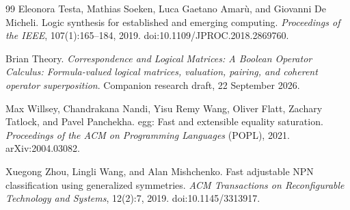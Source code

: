 \documentclass[10pt]{article}
\theoremstyle{plain}
\theoremstyle{definition}
\theoremstyle{remark}
\begin{document}
\begin{thebibliography}{99}
Eleonora Testa, Mathias Soeken, Luca Gaetano Amar\`u, and Giovanni De Micheli.
\newblock Logic synthesis for established and emerging computing.
\newblock \emph{Proceedings of the IEEE}, 107(1):165--184, 2019.
\newblock doi:10.1109/JPROC.2018.2869760.

Brian Theory.
\newblock \emph{Correspondence and Logical Matrices: A Boolean Operator Calculus: Formula-valued logical matrices, valuation, pairing, and coherent operator superposition}.
\newblock Companion research draft, 22 September 2026.

Max Willsey, Chandrakana Nandi, Yisu Remy Wang, Oliver Flatt, Zachary Tatlock, and Pavel Panchekha.
\newblock egg: Fast and extensible equality saturation.
\newblock \emph{Proceedings of the ACM on Programming Languages} (POPL), 2021.
\newblock arXiv:2004.03082.

Xuegong Zhou, Lingli Wang, and Alan Mishchenko.
\newblock Fast adjustable NPN classification using generalized symmetries.
\newblock \emph{ACM Transactions on Reconfigurable Technology and Systems}, 12(2):7, 2019.
\newblock doi:10.1145/3313917.

\end{thebibliography}
\end{document}
